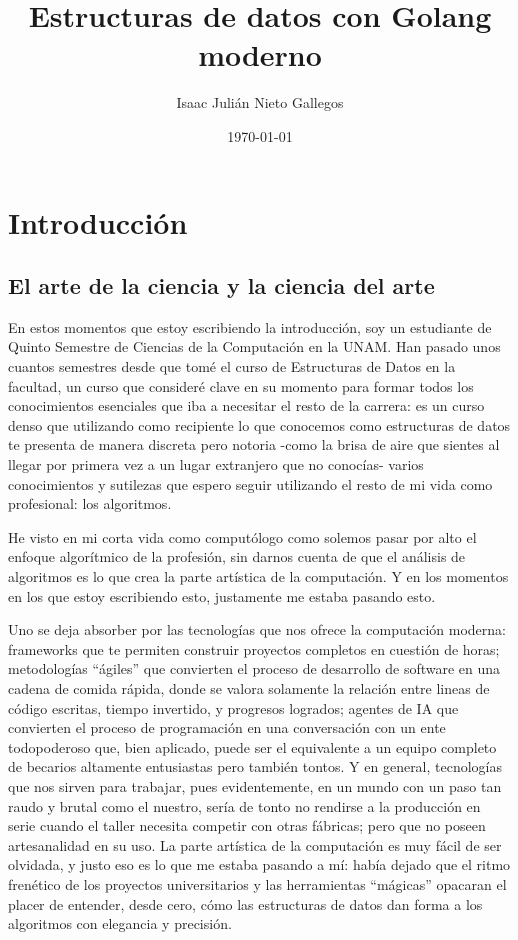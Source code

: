 \documentclass[11pt]{article}
\author{Isaac Julián Nieto Gallegos}
\date{\today}
\title{Estructuras de datos con Golang moderno}
\begin{document}
\maketitle
\tableofcontents

\section{Introducción}
\label{sec:org3057a7e}
\subsection{El arte de la ciencia y la ciencia del arte}
\label{sec:org6592670}
En estos momentos que estoy escribiendo la introducción, soy un estudiante de Quinto Semestre de Ciencias de la Computación en la UNAM.
Han pasado unos cuantos semestres desde que tomé el curso de Estructuras de Datos en la facultad, un curso que consideré clave en su momento para formar todos los conocimientos esenciales que iba a necesitar el resto de la carrera: es un curso denso que utilizando como recipiente lo que conocemos como estructuras de datos te presenta de manera discreta pero notoria -como la brisa de aire que sientes al llegar por primera vez a un lugar extranjero que no conocías- varios conocimientos y sutilezas que espero seguir utilizando el resto de mi vida como profesional: los algoritmos.

He visto en mi corta vida como computólogo como solemos pasar por alto el enfoque algorítmico de la profesión, sin darnos cuenta de que el análisis de algoritmos es lo que crea la parte artística de la computación. Y en los momentos en los que estoy escribiendo esto, justamente me estaba pasando esto.

Uno se deja absorber por las tecnologías que nos ofrece la computación moderna: frameworks que te permiten construir proyectos completos en cuestión de horas; metodologías ``ágiles'' que convierten el proceso de desarrollo de software en una cadena de comida rápida, donde se valora solamente la relación entre lineas de código escritas, tiempo invertido, y progresos logrados; agentes de IA que convierten el proceso de programación en una conversación con un ente todopoderoso que, bien aplicado, puede ser el equivalente a un equipo completo de becarios altamente entusiastas pero también tontos. Y en general, tecnologías que nos sirven para trabajar, pues evidentemente, en un mundo con un paso tan raudo y brutal como el nuestro, sería de tonto no rendirse a la producción en serie cuando el taller necesita competir con otras fábricas; pero que no poseen artesanalidad en su uso.
La parte artística de la computación es muy fácil de ser olvidada, y justo eso es lo que me estaba pasando a mí: había dejado que el ritmo frenético de los proyectos universitarios y las herramientas ``mágicas'' opacaran el placer de entender, desde cero, cómo las estructuras de datos dan forma a los algoritmos con elegancia y precisión.
\end{document}

